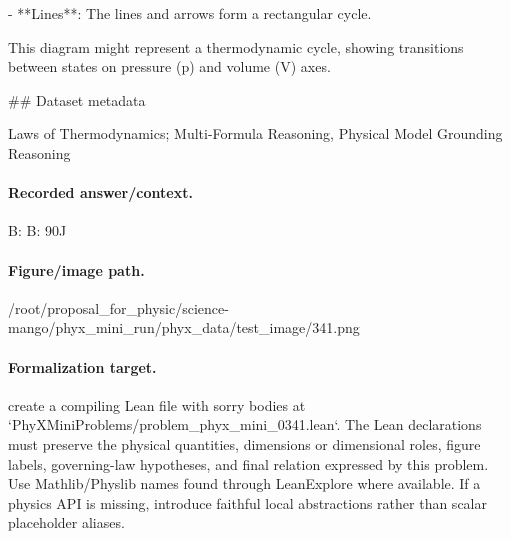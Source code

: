 - **Lines**: The lines and arrows form a rectangular cycle.

This diagram might represent a thermodynamic cycle, showing transitions between states on pressure (p) and volume (V) axes.

\#\# Dataset metadata

Laws of Thermodynamics; Multi-Formula Reasoning, Physical Model Grounding Reasoning

\paragraph{Recorded answer/context.}
B: B: 90J

\paragraph{Figure/image path.}
/root/proposal\_for\_physic/science-mango/phyx\_mini\_run/phyx\_data/test\_image/341.png

\paragraph{Formalization target.}
create a compiling Lean file with sorry bodies at `PhyXMiniProblems/problem\_phyx\_mini\_0341.lean`. The Lean declarations must preserve the physical quantities, dimensions or dimensional roles, figure labels, governing-law hypotheses, and final relation expressed by this problem.
Use Mathlib/Physlib names found through LeanExplore where available. If a physics API is missing, introduce faithful local abstractions rather than scalar placeholder aliases.


